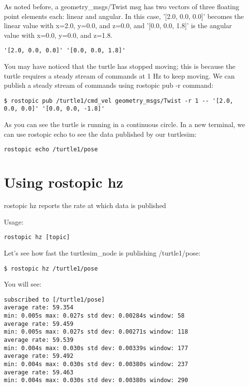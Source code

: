As noted before, a geometry\_msgs/Twist msg has two vectors of three floating point elements each: linear and angular. In this case, '[2.0, 0.0, 0.0]' becomes the linear value with x=2.0, y=0.0, and z=0.0, and '[0.0, 0.0, 1.8]' is the angular value with x=0.0, y=0.0, and z=1.8.
\begin{lstlisting}[breaklines=true languages=yaml]
'[2.0, 0.0, 0.0]' '[0.0, 0.0, 1.8]' 
\end{lstlisting}

You may have noticed that the turtle has stopped moving; this is because the turtle requires a steady stream of commands at 1 Hz to keep moving. We can publish a steady stream of commands using rostopic pub -r command:

\begin{lstlisting}[breaklines=true languages=bash]
$ rostopic pub /turtle1/cmd_vel geometry_msgs/Twist -r 1 -- '[2.0, 0.0, 0.0]' '[0.0, 0.0, -1.8]'
\end{lstlisting}

As you can see the turtle is running in a continuous circle. In a new terminal, we can use rostopic echo to see the data published by our turtlesim:

\begin{lstlisting}[breaklines=true languages=bash]
rostopic echo /turtle1/pose
\end{lstlisting}

\section{Using rostopic hz}

rostopic hz reports the rate at which data is published

Usage:
\begin{lstlisting}[breaklines=true languages=bash]
rostopic hz [topic]
\end{lstlisting}

Let's see how fast the turtlesim\_node is publishing /turtle1/pose:
\begin{lstlisting}[breaklines=true languages=bash]
$ rostopic hz /turtle1/pose
\end{lstlisting}

You will see:
\begin{lstlisting}[breaklines=true languages=bash]
subscribed to [/turtle1/pose]
average rate: 59.354
min: 0.005s max: 0.027s std dev: 0.00284s window: 58
average rate: 59.459
min: 0.005s max: 0.027s std dev: 0.00271s window: 118
average rate: 59.539
min: 0.004s max: 0.030s std dev: 0.00339s window: 177
average rate: 59.492
min: 0.004s max: 0.030s std dev: 0.00380s window: 237
average rate: 59.463
min: 0.004s max: 0.030s std dev: 0.00380s window: 290
\end{lstlisting}

